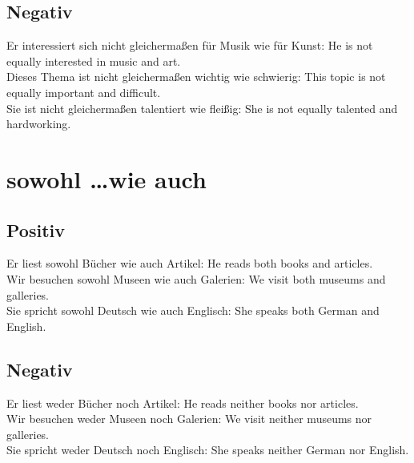 \documentclass[a4paper]{article}
\begin{document}
        \subsection{Negativ}
            Er interessiert sich nicht gleichermaßen für Musik wie für Kunst: He is not equally interested in music and art. \\
            Dieses Thema ist nicht gleichermaßen wichtig wie schwierig: This topic is not equally important and difficult. \\
            Sie ist nicht gleichermaßen talentiert wie fleißig: She is not equally talented and hardworking. \\
    
    
    \section{sowohl \dots wie auch}
        
        \subsection{Positiv}
            Er liest sowohl Bücher wie auch Artikel: He reads both books and articles. \\
            Wir besuchen sowohl Museen wie auch Galerien: We visit both museums and galleries. \\
            Sie spricht sowohl Deutsch wie auch Englisch: She speaks both German and English. \\
        
        \subsection{Negativ}
            Er liest weder Bücher noch Artikel: He reads neither books nor articles. \\
            Wir besuchen weder Museen noch Galerien: We visit neither museums nor galleries. \\
            Sie spricht weder Deutsch noch Englisch: She speaks neither German nor English. \\
    
    
\end{document}
